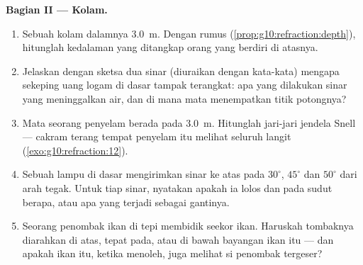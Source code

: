 \begin{problem}
\medskip
\noindent\textbf{Bagian II --- Kolam.}
\begin{enumerate}[resume]
  \item Sebuah kolam dalamnya \qty{3.0}{m}. Dengan rumus 
        (\cref{prop:g10:refraction:depth}), hitunglah kedalaman yang
        ditangkap orang yang berdiri di atasnya.
  \item Jelaskan dengan sketsa dua sinar (diuraikan dengan kata-kata)
        mengapa sekeping uang logam di dasar tampak terangkat: apa yang
        dilakukan sinar yang meninggalkan air, dan di mana mata
        menempatkan titik potongnya?
  \item Mata seorang penyelam berada pada \qty{3.0}{m}. Hitunglah
        jari-jari jendela Snell --- cakram terang tempat penyelam itu
        melihat seluruh langit (\cref{exo:g10:refraction:12}).
  \item Sebuah lampu di dasar mengirimkan sinar ke atas pada $30^\circ$,
        $45^\circ$ dan $50^\circ$ dari arah tegak. Untuk tiap sinar,
        nyatakan apakah ia lolos dan pada sudut berapa, atau apa yang
        terjadi sebagai gantinya.
  \item Seorang penombak ikan di tepi membidik seekor ikan. Haruskah
        tombaknya diarahkan di atas, tepat pada, atau di bawah bayangan
        ikan itu --- dan apakah ikan itu, ketika menoleh, juga melihat
        si penombak tergeser?
\end{enumerate}


\end{problem}
